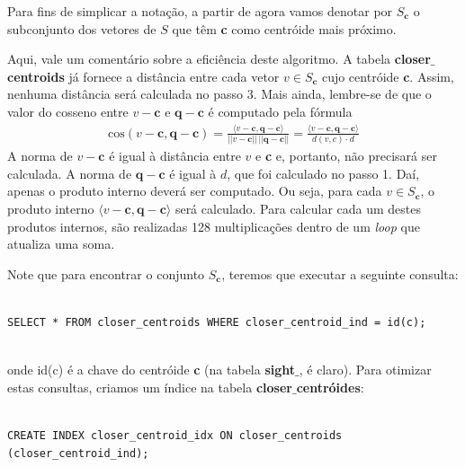 \documentclass[a4paper,12pt,titlepage]{scrartcl}
\begin{document}
Para fins de simplicar a notação, a partir de agora vamos denotar por $S_{\mathbf{c}}$ o subconjunto dos vetores de $S$ que têm \textbf{c} como centróide mais próximo. 

Aqui, vale um comentário sobre a eficiência deste algoritmo. A tabela \textbf{closer$\_$centroids} já fornece a distância entre cada vetor $v \in S_{\mathbf{c}}$ cujo centróide \textbf{c}. Assim, nenhuma distância será calculada no passo 3. Mais ainda, lembre-se de que o valor do cosseno entre $v-\mathbf{c}$ e $\mathbf{q}-\mathbf{c}$ é computado pela fórmula
\begin{align*} \mathrm{cos}(v-\mathbf{c},\mathbf{q}-\mathbf{c}) = \frac{\langle v-\mathbf{c},\mathbf{q}-\mathbf{c}\rangle}{||v-\mathbf{c}||\,||\mathbf{q}-\mathbf{c}||} = \frac{\langle v-\mathbf{c},\mathbf{q}-\mathbf{c}\rangle}{d(v,c)\cdot d}
\end{align*}
A norma de $v - \mathbf{c}$ é igual à distância entre $v$ e \textbf{c} e, portanto, não precisará ser calculada. A norma de $\mathbf{q} - \mathbf{c}$ é igual à $d$, que foi calculado no passo 1. Daí, apenas o produto interno deverá ser computado. Ou seja, para cada $v \in S_{\mathbf{c}}$, o produto interno $\langle v-\mathbf{c},\mathbf{q}-\mathbf{c}\rangle$ será calculado. Para calcular cada um destes produtos internos, são realizadas 128 multiplicações dentro de um \emph{loop} que atualiza uma soma. \\

\begin{remark} Note que para encontrar o conjunto $S_{\mathbf{c}}$, teremos que executar a seguinte consulta:\\

\begin{lstlisting}[caption = Encontrando $S_{\mathbf{c}}$, label = sc]

SELECT * FROM closer_centroids WHERE closer_centroid_ind = id(c);
   
\end{lstlisting}
\vspace{5mm}
onde id(c) é a chave do centróide \textbf{c} (na tabela \textbf{sight$\_$}, é claro). Para otimizar estas consultas, criamos um índice na tabela \textbf{closer$\_$centróides}:\\


\begin{lstlisting}[caption = Índice na chave do centróide mais próximo, label = indice]

CREATE INDEX closer_centroid_idx ON closer_centroids (closer_centroid_ind);

\end{lstlisting}
\vspace{5mm}
\end{remark}
\end{document}
